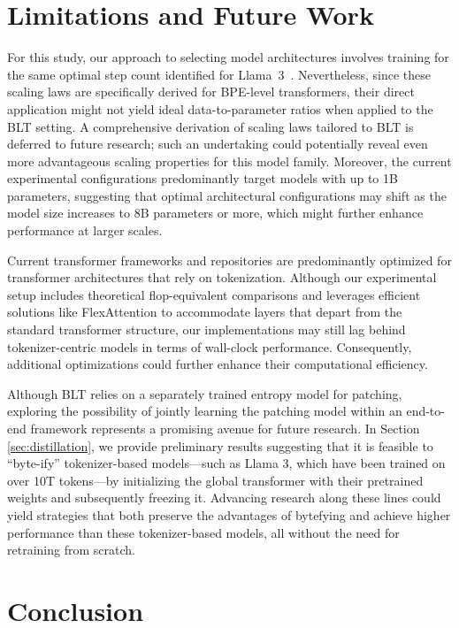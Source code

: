\section{Limitations and Future Work}

For this study, our approach to selecting model architectures involves training for the same optimal step count identified for Llama~3~\citep{dubey2024llama}. Nevertheless, since these scaling laws are specifically derived for BPE-level transformers, their direct application might not yield ideal data-to-parameter ratios when applied to the {\textsc BLT} setting. A comprehensive derivation of scaling laws tailored to {\textsc BLT} is deferred to future research; such an undertaking could potentially reveal even more advantageous scaling properties for this model family. Moreover, the current experimental configurations predominantly target models with up to 1B parameters, suggesting that optimal architectural configurations may shift as the model size increases to 8B parameters or more, which might further enhance performance at larger scales.

Current transformer frameworks and repositories are predominantly optimized for transformer architectures that rely on tokenization. Although our experimental setup includes theoretical flop-equivalent comparisons and leverages efficient solutions like FlexAttention to accommodate layers that depart from the standard transformer structure, our implementations may still lag behind tokenizer-centric models in terms of wall-clock performance. Consequently, additional optimizations could further enhance their computational efficiency.

Although {\textsc BLT} relies on a separately trained entropy model for patching, exploring the possibility of jointly learning the patching model within an end-to-end framework represents a promising avenue for future research. In Section \ref{sec:distillation}, we provide preliminary results suggesting that it is feasible to “byte-ify” tokenizer-based models—such as Llama 3, which have been trained on over 10T tokens—by initializing the global transformer with their pretrained weights and subsequently freezing it. Advancing research along these lines could yield strategies that both preserve the advantages of bytefying and achieve higher performance than these tokenizer-based models, all without the need for retraining from scratch.

\section{Conclusion}
\label{section:conclusion}


